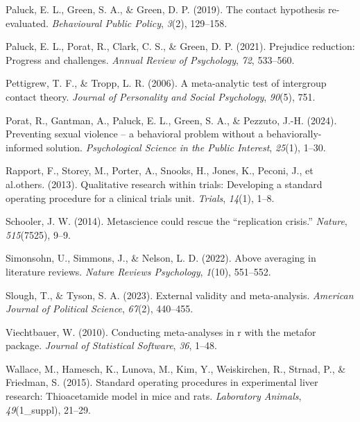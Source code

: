 \documentclass[
  man]{apa6}
\newlength{\cslhangindent}
\newenvironment{CSLReferences}[2] %
 {\begin{list}{}{%
  \setlength{\itemindent}{0pt}
  \setlength{\leftmargin}{0pt}
  \setlength{\parsep}{0pt}
  \ifodd #1
   \setlength{\leftmargin}{\cslhangindent}
   \setlength{\itemindent}{-1\cslhangindent}
  \fi
  \setlength{\itemsep}{#2\baselineskip}}}
 {\end{list}}
\begin{document}
\begin{CSLReferences}{1}{0}
Paluck, E. L., Green, S. A., \& Green, D. P. (2019). The contact hypothesis re-evaluated. \emph{Behavioural Public Policy}, \emph{3}(2), 129--158.

Paluck, E. L., Porat, R., Clark, C. S., \& Green, D. P. (2021). Prejudice reduction: Progress and challenges. \emph{Annual Review of Psychology}, \emph{72}, 533--560.

Pettigrew, T. F., \& Tropp, L. R. (2006). A meta-analytic test of intergroup contact theory. \emph{Journal of Personality and Social Psychology}, \emph{90}(5), 751.

Porat, R., Gantman, A., Paluck, E. L., Green, S. A., \& Pezzuto, J.-H. (2024). Preventing sexual violence -- a behavioral problem without a behaviorally-informed solution. \emph{Psychological Science in the Public Interest}, \emph{25}(1), 1--30.

Rapport, F., Storey, M., Porter, A., Snooks, H., Jones, K., Peconi, J., et al.others. (2013). Qualitative research within trials: Developing a standard operating procedure for a clinical trials unit. \emph{Trials}, \emph{14}(1), 1--8.

Schooler, J. W. (2014). Metascience could rescue the {``replication crisis.''} \emph{Nature}, \emph{515}(7525), 9--9.

Simonsohn, U., Simmons, J., \& Nelson, L. D. (2022). Above averaging in literature reviews. \emph{Nature Reviews Psychology}, \emph{1}(10), 551--552.

Slough, T., \& Tyson, S. A. (2023). External validity and meta-analysis. \emph{American Journal of Political Science}, \emph{67}(2), 440--455.

Viechtbauer, W. (2010). Conducting meta-analyses in r with the metafor package. \emph{Journal of Statistical Software}, \emph{36}, 1--48.

Wallace, M., Hamesch, K., Lunova, M., Kim, Y., Weiskirchen, R., Strnad, P., \& Friedman, S. (2015). Standard operating procedures in experimental liver research: Thioacetamide model in mice and rats. \emph{Laboratory Animals}, \emph{49}(1\_suppl), 21--29.

\end{CSLReferences}
\end{document}
